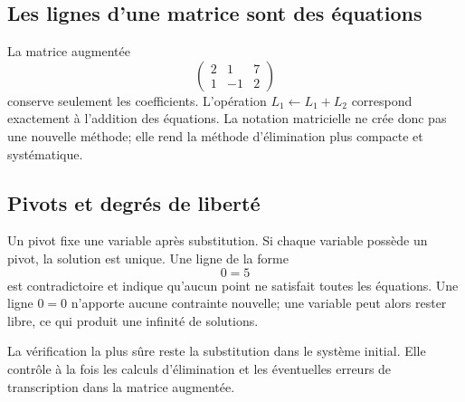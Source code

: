 \documentclass[12pt,a4paper,openany]{book}
\begin{document}
\begin{center}
\end{center}

\subsection{Les lignes d'une matrice sont des équations}
La matrice augmentée
\[
\left(\begin{array}{cc|c}2&1&7\\1&-1&2\end{array}\right)
\]
conserve seulement les coefficients. L'opération $L_1\leftarrow L_1+L_2$ correspond exactement à l'addition des équations. La notation matricielle ne crée donc pas une nouvelle méthode; elle rend la méthode d'élimination plus compacte et systématique.

\subsection{Pivots et degrés de liberté}
Un pivot fixe une variable après substitution. Si chaque variable possède un pivot, la solution est unique. Une ligne de la forme
\[
0=5
\]
est contradictoire et indique qu'aucun point ne satisfait toutes les équations. Une ligne $0=0$ n'apporte aucune contrainte nouvelle; une variable peut alors rester libre, ce qui produit une infinité de solutions.

\begin{visualbox}
La vérification la plus sûre reste la substitution dans le système initial. Elle contrôle à la fois les calculs d'élimination et les éventuelles erreurs de transcription dans la matrice augmentée.
\end{visualbox}
\end{document}
